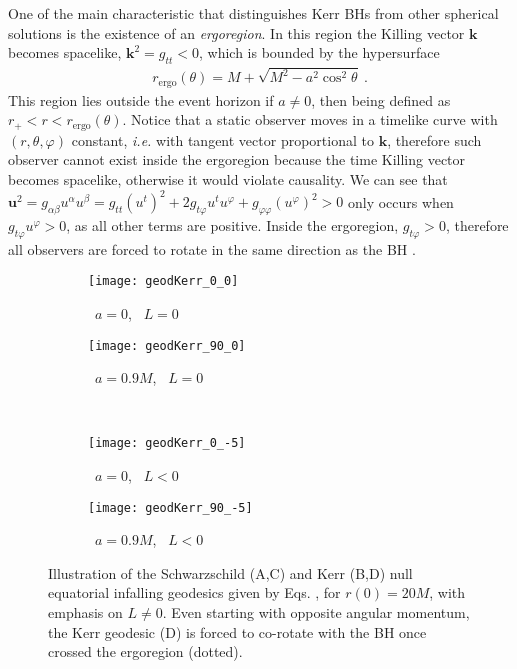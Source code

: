 One of the main characteristic that distinguishes Kerr BHs from other spherical solutions is the existence of an \emph{ergoregion}.
In this region the Killing vector $\bm{k}$ becomes spacelike, $\bm{k}^2=g_{tt}<0$, which is bounded by the hypersurface
\begin{align}
    r_{\mathrm{ergo}}(\theta) = M + \sqrt{M^2 - a^2 \cos^2\theta} ~.
    \label{eq2:KerrErgo}
\end{align}
This region lies outside the event horizon if $a\ne0$, then being defined as $r_+< r < r_{\mathrm{ergo}}(\theta)$.
Notice that a static observer moves in a timelike curve with $(r,\theta,\varphi)$ constant, \emph{i.e.} with tangent vector proportional to $\bm{k}$, therefore such observer cannot exist inside the ergoregion because the time Killing vector becomes spacelike, otherwise it would violate causality.
We can see that $\bm{u}^2=g_{\alpha\beta}u^\alpha u^\beta = g_{tt} (u^t)^2 + 2 g_{t\varphi} u^t u^\varphi +  g_{\varphi\varphi} (u^\varphi)^2 > 0$ only occurs when $g_{t\varphi} u^\varphi > 0$, as all other terms are positive.
Inside the ergoregion, $g_{t\varphi}>0$, therefore all observers are forced to rotate in the same direction as the BH \cite{Brito2015}.

\begin{figure}[h]
    \centering
    \vspace{0.5cm}
    \begin{subfigure}[c]{0.4\textwidth}
        \texttt{[image: geodKerr\_0\_0]}
        \caption{ ~$a=0$, ~$L=0$}
    \end{subfigure}
    \hspace{1cm}
    \begin{subfigure}[c]{0.4\textwidth}
        \texttt{[image: geodKerr\_90\_0]}
        \caption{~$a=0.9 M$, ~$L=0$}
    \end{subfigure}
    \\
    \vspace{0.3cm}
    \begin{subfigure}[c]{0.4\textwidth}
        \texttt{[image: geodKerr\_0\_-5]}
        \caption{~$a=0$, ~$L<0$}
    \end{subfigure}
    \hspace{1cm}
    \begin{subfigure}[c]{0.4\textwidth}
        \texttt{[image: geodKerr\_90\_-5]}
        \caption{~$a=0.9 M$, ~$L<0$}
    \end{subfigure}
    \caption{Illustration of the Schwarzschild ({\footnotesize\textsc{A,C}}) and Kerr ({\footnotesize\textsc{B,D}}) null equatorial infalling geodesics given by Eqs. , for $r(0)=20 M$, with emphasis on $L\ne0$. Even starting with opposite angular momentum, the Kerr geodesic ({\footnotesize\textsc{D}}) is forced to co-rotate with the BH once crossed the ergoregion (dotted).}
    \label{fig2:geodesics}
\end{figure}

